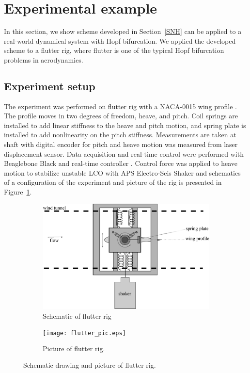 \documentclass[openacc]{rsproca_new}%
\newcommand{\Sref}[1]{Section~\ref{#1}}
\newcommand{\Fref}[1]{Figure~\ref{#1}}
\begin{document}
\section{Experimental example}
In this section, we show scheme developed in \Sref{SNH} can be applied to a real-world dynamical system with Hopf bifurcation. We applied the developed scheme to a flutter \cite{dimitriadis2017introduction} rig, where flutter is one of the typical Hopf bifurcation problems in aerodynamics.


\subsection{Experiment setup}\label{setup}
The experiment was performed on flutter rig with a NACA-0015 wing profile \cite{jacobs1933characteristics}. The profile moves in two degrees of freedom, heave, and pitch. Coil springs are installed to add linear stiffness to the heave and pitch motion, and spring plate is installed to add nonlinearity on the pitch stiffness. Measurements are taken at shaft with digital encoder for pitch and heave motion was measured from laser displacement sensor. Data acquisition and real-time control were performed with Beaglebone Black and real-time controller \cite{rtc2}. Control force was applied to heave motion to stabilize unstable LCO with APS Electro-Seis Shaker and schematics of a configuration of the experiment and picture of the rig is presented in \Fref{f:rig}.

\begin{figure}[h!]
  \centering
  \begin{subfigure}[b]{0.6\linewidth}
    \includegraphics[width=\linewidth]{flutter_rig.eps}
    \caption{Schematic of flutter rig}
  \end{subfigure}
  \begin{subfigure}[b]{0.6\linewidth}
    \texttt{[image: flutter\_pic.eps]}
    \caption{Picture of flutter rig.}
  \end{subfigure}
  \caption{Schematic drawing and picture of flutter rig.}
  \label{f:rig}
\end{figure}
\end{document}
